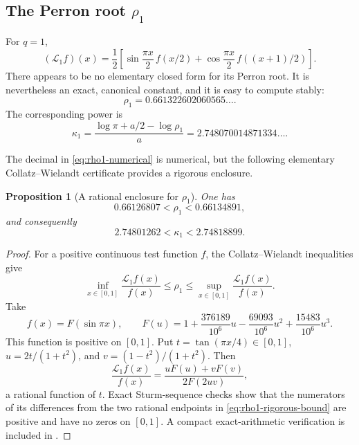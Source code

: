 \documentclass[11pt,oneside]{article}
\newtheorem{proposition}[proposition]{Proposition}
\theoremstyle{definition}
\theoremstyle{remark}
\begin{document}
\subsection{The Perron root \texorpdfstring{$\rho_1$}{rho1}}

For $q=1$,
\begin{equation}
 (\mathcal L_1f)(x)
 =\frac12\left[
  \sin\frac{\pi x}{2}\,f(x/2)
 +\cos\frac{\pi x}{2}\,f((x+1)/2)
 \right].
 \label{eq:L1}
\end{equation}
There appears to be no elementary closed form for its Perron root.  It is nevertheless an
exact, canonical constant, and it is easy to compute stably:
\begin{equation}
 \rho_1=0.661322602060565\ldots .
 \label{eq:rho1-numerical}
\end{equation}
The corresponding power is
\begin{equation}
 \boxed{\displaystyle
 \kappa_1
 =\frac{\log\pi+a/2-\log\rho_1}{a}
 =2.748070014871334\ldots .}
 \label{eq:kappa1}
\end{equation}

The decimal in \eqref{eq:rho1-numerical} is numerical, but the following elementary
Collatz--Wielandt certificate provides a rigorous enclosure.

\begin{proposition}[A rational enclosure for $\rho_1$]
\label{prop:rho1-rigorous-bound}
One has
\begin{equation}
 0.66126807<\rho_1<0.66134891,
 \label{eq:rho1-rigorous-bound}
\end{equation}
and consequently
\begin{equation}
 2.74801262<\kappa_1<2.74818899.
 \label{eq:kappa1-rigorous-bound}
\end{equation}
\end{proposition}

\begin{proof}
For a positive continuous test function $f$, the Collatz--Wielandt inequalities give
\[
 \inf_{x\in[0,1]}\frac{\mathcal L_1f(x)}{f(x)}
 \le\rho_1\le
 \sup_{x\in[0,1]}\frac{\mathcal L_1f(x)}{f(x)}.
\]
Take
\[
 f(x)=F(\sin\pi x),\qquad
 F(u)=1+\frac{376189}{10^6}u-\frac{69093}{10^6}u^2
       +\frac{15483}{10^6}u^3.
\]
This function is positive on $[0,1]$.  Put $t=\tan(\pi x/4)\in[0,1]$,
$u=2t/(1+t^2)$, and $v=(1-t^2)/(1+t^2)$.  Then
\[
 \frac{\mathcal L_1f(x)}{f(x)}
 =\frac{uF(u)+vF(v)}{2F(2uv)},
\]
a rational function of $t$.  Exact Sturm-sequence checks show that the numerators of its
differences from the two rational endpoints in \eqref{eq:rho1-rigorous-bound} are positive
and have no zeros on $[0,1]$.  A compact exact-arithmetic verification is included in
.
\end{proof}
\end{document}
